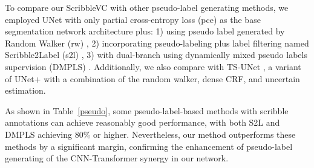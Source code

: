 \documentclass[sigconf,natbib=false]{acmart}
\begin{document}
To compare our ScribbleVC with other pseudo-label generating methods, we employed UNet with only partial cross-entropy loss (pce) \cite{lin2016scribblesup} as the base segmentation network architecture plus: 1) using pseudo label generated by Random Walker (rw) \cite{grady2006random}, 2) incorporating pseudo-labeling plus label filtering named Scribble2Label (s2l) \cite{S2L}, 3) with dual-branch using dynamically mixed pseudo labels supervision (DMPLS) \cite{luo2022scribble}.
Additionally,  we also compare with TS-UNet \cite{can2018learning}, a variant of UNet+ with a combination of the random walker, dense CRF, and uncertain estimation.
\vspace{-2mm}
\begin{table}[!htbp]\footnotesize
\setlength{\abovecaptionskip}{0mm}
  \centering
  \caption{Comparison with pseudo-label generating methods on the ACDC dataset.}
  \label{pseudo}\vspace{-2mm}
\end{table}\vspace{-2mm}

As shown in Table~\ref{pseudo}, some pseudo-label-based methods with scribble annotations can achieve reasonably good performance, with both S2L and DMPLS achieving 80\% or higher. Nevertheless, our method outperforms these methods by a significant margin, confirming the enhancement of pseudo-label generating of the CNN-Transformer synergy in our network.
\vspace{-2mm}
\end{document}
